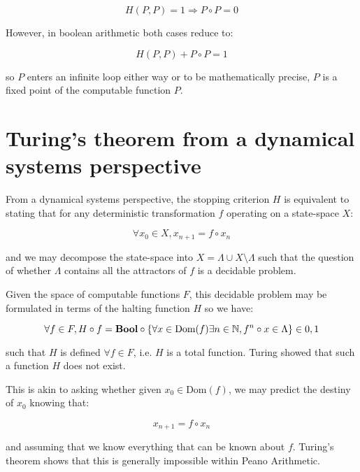 \documentclass{article}
\begin{document}
\begin{equation}
H(P,P) = 1 \Rightarrow P \circ P = 0
\end{equation}

However, in boolean arithmetic both cases reduce to:

\begin{equation}
H(P,P) + P \circ P = 1
\end{equation}

so $P$ enters an infinite loop either way or to be mathematically precise, $P$ is a fixed
point of the computable function $P$.

\section{Turing's theorem from a dynamical systems perspective}

From a dynamical systems perspective, the stopping criterion $H$ is equivalent to stating that
for any deterministic transformation $f$ operating on a state-space $X$:

\begin{equation}
\forall x_0 \in X, x_{n+1} = f \circ x_n
\end{equation}

and we may decompose the state-space into $X = \Lambda \cup X \setminus \Lambda$ such that the question of whether $\Lambda$ contains all the attractors of $f$ is a decidable problem.

Given the space of computable functions $F$, this decidable problem may be formulated in terms of the
halting function $H$ so we have:

\begin{equation}
\forall f \in F, H \circ f = \textbf{Bool} \circ \{\forall x \in \text{Dom}(f) \exists n \in \mathbb{N}, f^n \circ x \in \Lambda\} \in \\{0,1\\}
\end{equation}

such that $H$ is defined $\forall f \in F$, i.e. $H$ is a total function. Turing showed that such a function $H$
does not exist.

This is akin to asking whether given $x_0 \in \text{Dom}(f)$, we may predict the destiny of $x_0$ knowing that:

\begin{equation}
x_{n+1} = f \circ x_n
\end{equation}

and assuming that we know everything that can be known about $f$. Turing's theorem shows that this is generally impossible
within Peano Arithmetic.
\end{document}
